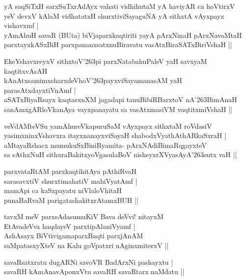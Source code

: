 \begin{itemize}
{\bf
\item[(1)] yA saqSiTxH sarxSuTxrAdAyx vahati vidhihutaM yA haviyAR ca hoVtirxV \\\label{243}
yeV devxV kAlaM vidhatatxH shurxtiviSayaguNA yA sithxtA vAyxpayx vishavxmf |\\
yAmAhuH savaR (BUta) biVjaparxkaqtiriti yayA pArxNinaH pArxNavaMtaH \\
parxtayxkASxBiH parxpananxsatxnuBiravatu vasAtxBiraSATxBiriVshaH ||
\item[(2)] EkeYshavxreyxV sithxtoV\char'263pi parxNatabahuPaleV yaH savxyaM kaqtitxvAsAH \\\label{243}
kAnAtxsamimxsharxdeVhoV\char'263payxviSayamanasAM yaH parasAtxdayxtiVnAmf |\\
aSATxBiyaRsayx kaqtasxnXM jagadapi tanuBibiRBarxtoV nA\char'263BimAnaH\\
sanAmxgARloVkanAya vayxpanayatu sa vasAtxmasiVM vaqtitxmiVshaH ||
\item[(3)] veVdAMteVSu yamAhureVkapuruSaM vAyxpayx sithxtaM roVdasiV\\\label{243}
yasimxninxVshavxra itayxnanayxviSayaH shabodxVyathAthARkaSxraH |\\
aMtayaRshacx mumukuSxBiniRyamita- pArxNAdiBimaRqgayxteV \\
sa sAthxNuH sithxraBakitxyoVgasulaBoV nisheyxrXVyasAyA\char'263sutx vaH ||}

\begin{itemize}
{\bf
\item[(1)] parxvataRtAM parxkaqtihitAya pAthiRvaH\\\label{243}
sarasavxtiV shurxtimahatiV mahiVyatAmf |\\
mamApi ca kaSxpayatu niVlaloVhitaH \\
punaBaRvaM parigatashakitxrAtamxBUH ||
\item[(2)] tavxM meV parxsAdasumuKiV Bava deVvi! nitayxM\\\label{244}
EtAvadeVva haqdayeV parxtipAlaniVyamf |\\
AshAsayx BiVtivigamaparxBaqti parxjAnAM \\
saMpatasxyXteV na Kalu goVpatxri nAginxmiterxV ||
\item[(3)] savaRsatxratu dugARNi savoVR BadArxNi pashayxtu |\\\label{244}
savaRH kAmAnavAponxVtu savaRH savaRtarx naMdatu ||}
\end{itemize}
\end{itemize}

